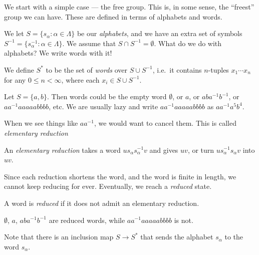 \documentclass[a4paper]{article}
\begin{document}
We start with a simple case --- the free group. This is, in some sense, the ``freest'' group we can have. These are defined in terms of alphabets and words.

\begin{defi}
 We let $S = \{s_\alpha: \alpha \in \Lambda\}$ be our \emph{alphabets}, and we have an extra set of symbols $S^{-1} = \{s_\alpha^{-1}: \alpha \in \Lambda\}$. We assume that $S\cap S^{-1} = \emptyset$. What do we do with alphabets? We write words with it!

 We define $S^*$ to be the set of \emph{words} over $S\cup S^{-1}$, i.e.\ it contains $n$-tuples $x_1 \cdots x_n$ for any $0 \leq n < \infty$, where each $x_i \in S \cup S^{-1}$.
\end{defi}

\begin{eg}
  Let $S = \{a, b\}$. Then words could be the empty word $\emptyset$, or $a$, or $aba^{-1}b^{-1}$, or $aa^{-1}aaaaabbbb$, etc. We are usually lazy and write $aa^{-1}aaaaabbbb$ as $aa^{-1}a^5 b^4$.
\end{eg}

When we see things like $aa^{-1}$, we would want to cancel them. This is called \emph{elementary reduction}
\begin{defi}
  An \emph{elementary reduction} takes a word $us_\alpha s_\alpha^{-1}v$ and gives $uv$, or turn $us_\alpha^{-1}s_\alpha v$ into $uv$.
\end{defi}
Since each reduction shortens the word, and the word is finite in length, we cannot keep reducing for ever. Eventually, we reach a \emph{reduced} state.

\begin{defi}
  A word is \emph{reduced} if it does not admit an elementary reduction.
\end{defi}

\begin{eg}
  $\emptyset$, $a$, $aba^{-1}b^{-1}$ are reduced words, while $aa^{-1}aaaaabbbb$ is not.
\end{eg}
Note that there is an inclusion map $S \to S^*$ that sends the alphabet $s_\alpha$ to the word $s_\alpha$.
\end{document}
